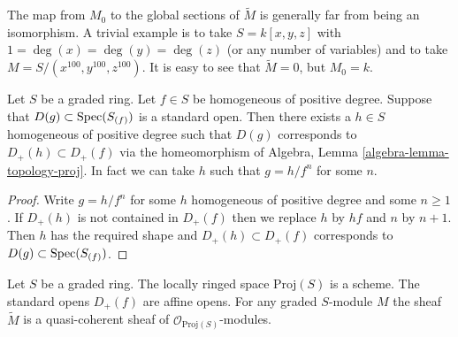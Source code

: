 \begin{remark}
\label{remark-global-sections-not-isomorphism}
The map from $M_0$ to the global sections of $\widetilde M$
is generally far from being an isomorphism. A trivial
example is to take $S = k[x, y, z]$ with $1 = \deg(x) = \deg(y) = \deg(z)$
(or any number of variables) and to take $M = S/(x^{100}, y^{100}, z^{100})$.
It is easy to see that $\widetilde M = 0$, but $M_0 = k$.
\end{remark}

\begin{lemma}
\label{lemma-standard-open-proj}
Let $S$ be a graded ring. Let $f \in S$ be homogeneous of positive degree.
Suppose that $D(g) \subset \mathop{\rm Spec}(S_{(f)})$ is a standard open.
Then there exists a $h \in S$ homogeneous of positive degree such that
$D(g)$ corresponds to $D_{+}(h) \subset D_{+}(f)$ via the homeomorphism
of Algebra, Lemma \ref{algebra-lemma-topology-proj}. In fact we can
take $h$ such that $g = h/f^n$ for some $n$.
\end{lemma}

\begin{proof}
Write $g = h/f^n$ for some $h$ homogeneous of positive degree
and some $n \geq 1$. If $D_{+}(h)$ is not contained in
$D_{+}(f)$ then we replace $h$ by $hf$ and $n$ by $n + 1$.
Then $h$ has the required shape and $D_{+}(h) \subset D_{+}(f)$
corresponds to $D(g) \subset \mathop{\rm Spec}(S_{(f)})$.
\end{proof}

\begin{lemma}
\label{lemma-proj-scheme}
Let $S$ be a graded ring.
The locally ringed space $\text{Proj}(S)$ is a scheme.
The standard opens $D_{+}(f)$ are affine opens.
For any graded $S$-module $M$ the sheaf
$\widetilde M$ is a quasi-coherent sheaf of
$\mathcal{O}_{\text{Proj}(S)}$-modules.
\end{lemma}

